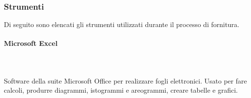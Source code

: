 \begin{comment}
		\paragraph{Piano di Qualifica} \mbox{}\\ \mbox{}\\
		I verificatori dovranno redigere un documento, detto \textit{Piano di Qualifica} contenente le strategie da adottare per garantire la qualità del materiale prodotto dal gruppo, e dei processi attuati. Il piano è così suddiviso:
		\begin{itemize}
			\item \textbf{Qualità di processo}: vengono identificati dei processi dagli standard, stabiliti degli obiettivi, escogitate delle strategie per attuarli e individuate le metriche per misurarli e controllarli;
			\item \textbf{Qualità di prodotto}: vengono identificati gli attributi più rilevanti per il prodotto, definiti degli obiettivi per raggiungerli e delle metriche per misurarli;
			\item \textbf{Specifiche dei test}: definiscono una serie di test attraverso i quali il prodotto passa per garantire che soddisfi i requisiti;
			\item \textbf{Standard di qualità}: vengono esposti gli standard di qualità scelti;
			\item \textbf{Valutazioni per il miglioramento:} vengono riportati i problemi e le relative soluzioni nel ricoprire un determinato ruolo e nell'uso degli strumenti scelti;
			\item \textbf{Resoconto delle attività di verifica:} per ogni attività si riportano i risultati delle metriche calcolate in forma di resoconto.
		\end{itemize}
		\end{comment}
		\subsubsection{Strumenti}
		Di seguito sono elencati gli strumenti utilizzati durante il processo di fornitura.
		\paragraph{Microsoft Excel} \mbox{}\\ \mbox{}\\
		Software della suite Microsoft Office per realizzare fogli elettronici. Usato per fare calcoli, produrre diagrammi, istogrammi e areogrammi, creare tabelle e grafici.
